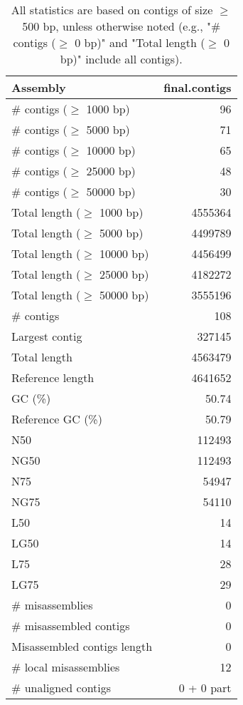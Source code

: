 \documentclass[12pt,a4paper]{article}
\begin{document}
\begin{table}[ht]
\begin{center}
\caption{All statistics are based on contigs of size $\geq$ 500 bp, unless otherwise noted (e.g., "\# contigs ($\geq$ 0 bp)" and "Total length ($\geq$ 0 bp)" include all contigs).}
\begin{tabular}{|l*{1}{|r}|}
\hline
Assembly & final.contigs \\ \hline
\# contigs ($\geq$ 1000 bp) & 96 \\ \hline
\# contigs ($\geq$ 5000 bp) & 71 \\ \hline
\# contigs ($\geq$ 10000 bp) & 65 \\ \hline
\# contigs ($\geq$ 25000 bp) & 48 \\ \hline
\# contigs ($\geq$ 50000 bp) & 30 \\ \hline
Total length ($\geq$ 1000 bp) & 4555364 \\ \hline
Total length ($\geq$ 5000 bp) & 4499789 \\ \hline
Total length ($\geq$ 10000 bp) & 4456499 \\ \hline
Total length ($\geq$ 25000 bp) & 4182272 \\ \hline
Total length ($\geq$ 50000 bp) & 3555196 \\ \hline
\# contigs & 108 \\ \hline
Largest contig & 327145 \\ \hline
Total length & 4563479 \\ \hline
Reference length & 4641652 \\ \hline
GC (\%) & 50.74 \\ \hline
Reference GC (\%) & 50.79 \\ \hline
N50 & 112493 \\ \hline
NG50 & 112493 \\ \hline
N75 & 54947 \\ \hline
NG75 & 54110 \\ \hline
L50 & 14 \\ \hline
LG50 & 14 \\ \hline
L75 & 28 \\ \hline
LG75 & 29 \\ \hline
\# misassemblies & 0 \\ \hline
\# misassembled contigs & 0 \\ \hline
Misassembled contigs length & 0 \\ \hline
\# local misassemblies & 12 \\ \hline
\# unaligned contigs & 0 + 0 part \\ \hline

\end{tabular}
\end{center}
\end{table}
\end{document}
